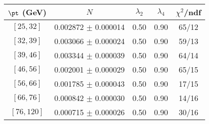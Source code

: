 \begin{tabular}{c||c|c|c|c}
$\pt$ (GeV) & $N$ & $\lambda_{2}$ & $\lambda_4$  & $\chi^2$/ndf  \\
\hline
$[25, 32]$ & 0.002872 $\pm$ 0.000014 & 0.50 & 0.90 & 65/12\\
$[32, 39]$ & 0.003066 $\pm$ 0.000024 & 0.50 & 0.90 & 59/13\\
$[39, 46]$ & 0.003344 $\pm$ 0.000039 & 0.50 & 0.90 & 64/14\\
$[46, 56]$ & 0.002001 $\pm$ 0.000029 & 0.50 & 0.90 & 65/15\\
$[56, 66]$ & 0.001785 $\pm$ 0.000043 & 0.50 & 0.90 & 17/15\\
$[66, 76]$ & 0.000842 $\pm$ 0.000030 & 0.50 & 0.90 & 14/16\\
$[76, 120]$ & 0.000715 $\pm$ 0.000026 & 0.50 & 0.90 & 30/16\\
\end{tabular}
